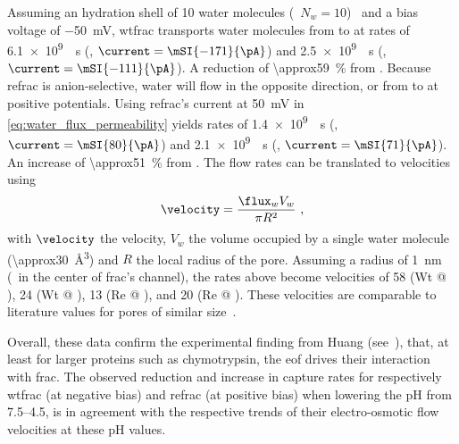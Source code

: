 Assuming an hydration shell of 10 water molecules (\ie~$N_{w} = 10$)~\cite{Boukhet-2016,Piguet-2014} and a
bias voltage of \SI{-50}{\mV}, \gls{wtfrac} transports water molecules from \cisi{} to \transi{} at rates of
\SI{6.1e9}{\per\second} (, $\current = \mSI{-171}{\pA}$) and \SI{2.5e9}{\per\second} (,
$\current = \mSI{-111}{\pA}$). A reduction of \SI{\approx59}{\percent} from . Because
\Gls{refrac} is anion-selective, water will flow in the opposite direction, or from \cisi{} to \transi{} at
positive potentials. Using \gls{refrac}'s current at \SI{+50}{\mV} in \cref{eq:water_flux_permeability} yields
rates of \SI{1.4e9}{\per\second} (, $\current = \mSI{80}{\pA}$) and \SI{2.1e9}{\per\second} (,
$\current = \mSI{71}{\pA}$). An increase of \SI{\approx51}{\percent} from . The flow rates
can be translated to velocities using
%
\begin{equation}\label{eq:water_flux_to_velocity}
  \velocity = \dfrac{\flux_{w} V_{w}}{\pi R^2}
  \text{ ,}
\end{equation}
%
with $\velocity$ the velocity, $V_{w}$ the volume occupied by a single water molecule
(\SI{\approx30}{\cubic\angstrom}) and $R$ the local radius of the pore. Assuming a radius of \SI{1}{\nm}
(\eg~in the center of \gls{frac}'s channel), the rates above become velocities of \SI{58}{\mmps} (Wt @
), \SI{24}{\mmps} (Wt @ ), \SI{13}{\mmps} (Re @ ), and \SI{20}{\mmps} (Re @ ).
These velocities are comparable to literature values for pores of similar
size~\cite{Boukhet-2016,Piguet-2014,Pederson-2015}.

Overall, these data confirm the experimental finding from Huang \etal{} (see~\cite{Huang-2017}), that, at
least for larger proteins such as chymotrypsin, the \gls{eof} drives their interaction with \gls{frac}. The
observed reduction and increase in capture rates for respectively \gls{wtfrac} (at negative bias) and
\gls{refrac} (at positive bias) when lowering the pH from \numrange{7.5}{4.5}, is in agreement with the
respective trends of their electro-osmotic flow velocities at these pH values.


